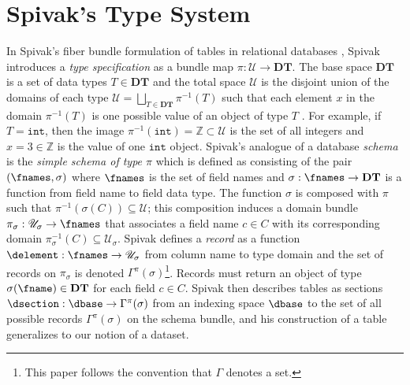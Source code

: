 \documentclass{vgtc}
\theoremstyle{definition}
\theoremstyle{remark}
\begin{document}
\section{Spivak's Type System}
\label{sec:spivak}
In Spivak's fiber bundle formulation of tables in relational databases \cite{spivakDatabasesAreCategories2010, spivakSimplicialDatabases2009}, Spivak introduces a \textit{type specification} as a bundle map $\pi: \mathscr{U} \rightarrow \textbf{DT}$. The base space $\textbf{DT}$ is a set of data types $T \in \textbf{DT}$ and the total space $\mathscr{U}$ is the disjoint union of the domains of each type $\mathscr{U} = \bigsqcup_{T \in \textbf{DT}} \pi^{-1}(T)$ such that each element $x$ in the domain $\pi^{-1}(T)$ is one possible value of an object of type $T$ \cite{spivakSimplicialDatabases2009}. For example, if $T=\texttt{int}$, then the image $\pi^{-1}(\texttt{int}) = \mathbb{Z} \subset \mathscr{U}$ is the set of all integers and $x=3 \in \mathbb{Z}$ is the value of one $\texttt{int}$ object. Spivak's analogue of a database \textit{schema} is the \textit{simple schema of type $\pi$} which is defined as consisting of the pair $(\fnames, \sigma)$ where $\fnames$ is the set of field names and $\sigma: \fnames \rightarrow \textbf{DT}$ is a function from field name to field data type\cite{spivakSimplicialDatabases2009}. The function $\sigma$ is composed with $\pi$ such that $\pi^{-1}(\sigma(C)) \subseteq \mathscr{U}$; this composition induces a domain bundle $\pi_{\sigma}:\mathscr{U}_{\sigma} \rightarrow \fnames$ that associates a field name $c \in C$ with its corresponding domain $\pi^{-1}_{\sigma}(C) \subseteq \mathscr{U}_{\sigma}$. Spivak defines a \textit{record} as a function $\delement: \fnames \rightarrow \mathscr{U}_{\sigma}$ from column name to type domain and the set of records on $\pi_{\sigma}$ is denoted $\Gamma^{\pi}(\sigma)$\footnote{This paper follows the convention that $\Gamma$ denotes a set.}. Records must return an object of type $\sigma(\fname) \in \textbf{DT}$ for each field $c \in C$. Spivak then describes tables as sections $\dsection: \dbase \rightarrow \Gamma^{\pi}(\sigma)$ from an indexing space $\dbase$ to the set of all possible records $\Gamma^{\pi}(\sigma)$ on the schema bundle, and his construction of a table generalizes to our notion of a dataset. 



\end{document}
